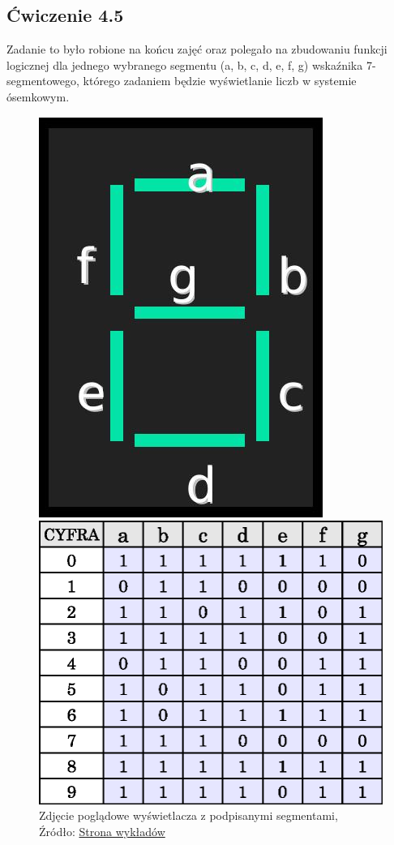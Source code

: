 \documentclass{article}
\begin{document}
    \subsection{Ćwiczenie 4.5}
      Zadanie to było robione na końcu zajęć oraz polegało na zbudowaniu funkcji logicznej dla jednego wybranego segmentu (a, b, c, d, e, f, g) wskaźnika 7-segmentowego, którego zadaniem będzie wyświetlanie liczb w systemie ósemkowym. 
      \pagebreak
      \begin{figure}[!ht]
        \begin{minipage}{.5\textwidth}
          \centering
          \includegraphics[scale=0.55]{grafiki/wyswietlacz.jpg}
          \caption{Zdjęcie poglądowe wyświetlacza z podpisanymi segmentami,
          \\Źródło: \href{https://spe.if.uj.edu.pl/literatura}{Strona wykładów}}
            \end{minipage}
          \begin{minipage}{.5\textwidth}
        \centering
        \includegraphics[scale=0.65]{grafiki/wyswietlacz_segmenty_tabela.eps}

\end{minipage}
\end{figure}
\end{document}
